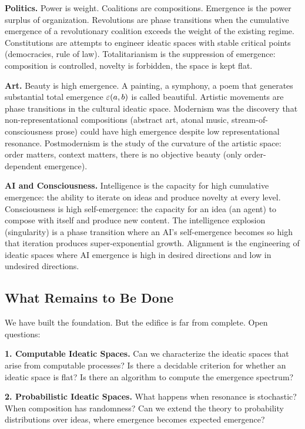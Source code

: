 \textbf{Politics.} Power is weight. Coalitions are compositions. Emergence is
the power surplus of organization. Revolutions are phase transitions when the
cumulative emergence of a revolutionary coalition exceeds the weight of the
existing regime. Constitutions are attempts to engineer ideatic spaces with
stable critical points (democracies, rule of law). Totalitarianism is the
suppression of emergence: composition is controlled, novelty is forbidden, the
space is kept flat.

\textbf{Art.} Beauty is high emergence. A painting, a symphony, a poem that
generates substantial total emergence $\varepsilon(a,b)$ is called beautiful. Artistic
movements are phase transitions in the cultural ideatic space. Modernism was
the discovery that non-representational compositions (abstract art, atonal music,
stream-of-consciousness prose) could have high emergence despite low representational
resonance. Postmodernism is the study of the curvature of the artistic space:
order matters, context matters, there is no objective beauty (only order-dependent
emergence).

\textbf{AI and Consciousness.} Intelligence is the capacity for high cumulative
emergence: the ability to iterate on ideas and produce novelty at every level.
Consciousness is high self-emergence: the capacity for an idea (an agent) to
compose with itself and produce new content. The intelligence explosion (singularity)
is a phase transition where an AI's self-emergence becomes so high that iteration
produces super-exponential growth. Alignment is the engineering of ideatic spaces
where AI emergence is high in desired directions and low in undesired directions.

\subsection{What Remains to Be Done}

We have built the foundation. But the edifice is far from complete. Open questions:

\textbf{1. Computable Ideatic Spaces.} Can we characterize the ideatic spaces
that arise from computable processes? Is there a decidable criterion for whether
an ideatic space is flat? Is there an algorithm to compute the emergence spectrum?

\textbf{2. Probabilistic Ideatic Spaces.} What happens when resonance is stochastic?
When composition has randomness? Can we extend the theory to probability distributions
over ideas, where emergence becomes expected emergence?

